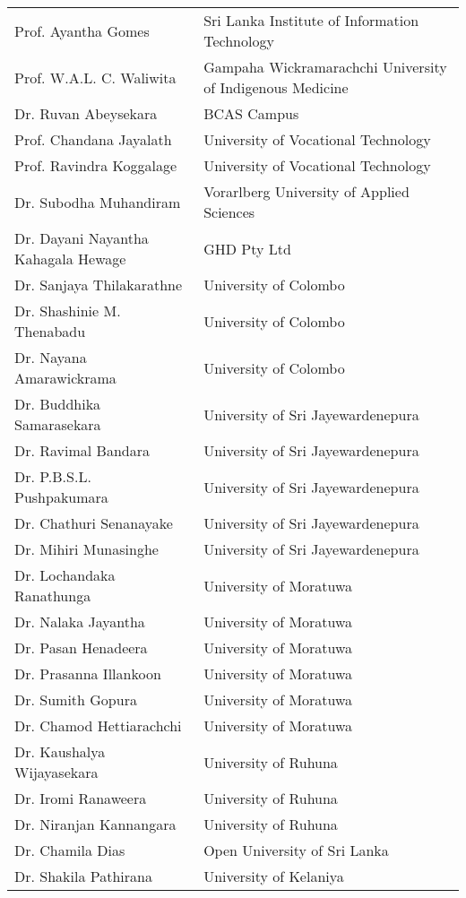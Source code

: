 \begin{longtable}{ L{4.8cm}  L{6.5cm} }  

    Prof. Ayantha Gomes & Sri Lanka Institute of Information Technology\\
Prof. W.A.L. C. Waliwita & Gampaha Wickramarachchi University of Indigenous Medicine\\
Dr. Ruvan Abeysekara & BCAS Campus\\
Prof. Chandana Jayalath & University of Vocational Technology\\
Prof. Ravindra Koggalage & University of Vocational Technology\\
Dr. Subodha Muhandiram & Vorarlberg University of Applied Sciences\\
Dr. Dayani Nayantha Kahagala Hewage & GHD Pty Ltd\\
Dr. Sanjaya Thilakarathne & University of Colombo\\
Dr. Shashinie M. Thenabadu & University of Colombo\\
Dr. Nayana Amarawickrama & University of Colombo\\
Dr. Buddhika Samarasekara & University of Sri Jayewardenepura\\
Dr. Ravimal Bandara & University of Sri Jayewardenepura\\
Dr. P.B.S.L. Pushpakumara & University of Sri Jayewardenepura\\
Dr. Chathuri Senanayake & University of Sri Jayewardenepura\\
Dr. Mihiri Munasinghe & University of Sri Jayewardenepura\\
Dr. Lochandaka Ranathunga & University of Moratuwa\\
Dr. Nalaka Jayantha & University of Moratuwa\\
Dr. Pasan Henadeera & University of Moratuwa\\
Dr. Prasanna Illankoon & University of Moratuwa\\
Dr. Sumith Gopura & University of Moratuwa\\
Dr. Chamod Hettiarachchi & University of Moratuwa\\
Dr. Kaushalya Wijayasekara & University of Ruhuna\\
Dr. Iromi Ranaweera & University of Ruhuna\\
Dr. Niranjan Kannangara & University of Ruhuna\\
Dr. Chamila Dias & Open University of Sri Lanka\\
Dr. Shakila Pathirana & University of Kelaniya\\

\end{longtable}
